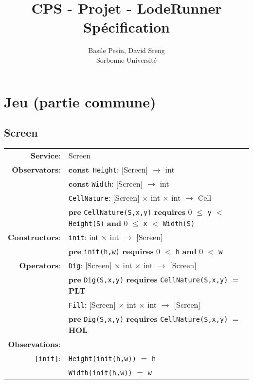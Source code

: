 \documentclass[8pt]{article}
\title{CPS - Projet - LodeRunner\\Spécification}
\author{Basile Pesin, David Sreng\\Sorbonne Université}
\begin{document}
\maketitle

\section{Jeu (partie commune)}

\subsection{Screen}

{\small
\begin{longtable}{rl}
  \textbf{Service}: & \textrm{Screen}  \\
  \textbf{Observators}: & \textbf{const}~\texttt{Height}: \textrm{[Screen]} $\rightarrow$ \textrm{int} \\
  & \textbf{const} \texttt{Width}: \textrm{[Screen]} $\rightarrow$ \textrm{int} \\
  & \texttt{CellNature}: \textrm{[Screen]} $\times$ \textrm{int} $\times$ \textrm{int} $\rightarrow$ \textrm{Cell} \\
  & \quad \textbf{pre } \texttt{CellNature(S,x,y)} \textbf{ requires } 0 $\leq$ \texttt{y} $<$ \texttt{Height(S)} \textbf{ and } 0 $\leq$ \texttt{x} $<$ \texttt{Width(S)}\\
  \textbf{Constructors}: & \texttt{init}: \textrm{int} $\times$ \textrm{int} $\rightarrow$ \textrm{[Screen]} \\
  & \quad \textbf{pre } \texttt{init(h,w)} \textbf{ requires } 0 $<$ \texttt{h} \textbf{ and } 0 $<$ \texttt{w} \\
  \textbf{Operators}: & \texttt{Dig}: \textrm{[Screen]} $\times$ \textrm{int} $\times$ \textrm{int}  $\rightarrow$ \textrm{[Screen]} \\
  & \quad \textbf{pre } \texttt{Dig(S,x,y)} \textbf{ requires } \texttt{CellNature(S,x,y)} $=$ \textbf{PLT} \\
  & \texttt{Fill}: \textrm{[Screen]} $\times$ \textrm{int} $\times$ \textrm{int}  $\rightarrow$ \textrm{[Screen]} \\
  & \quad \textbf{pre } \texttt{Dig(S,x,y)} \textbf{ requires } \texttt{CellNature(S,x,y)} $=$ \textbf{HOL} \\
  \textbf{Observations}: & \\
  \texttt{[init]}: & \texttt{Height(init(h,w))} $=$ \texttt{h} \\
  & \texttt{Width(init(h,w))} $=$ \texttt{w} \\

\end{longtable}}
\end{document}
